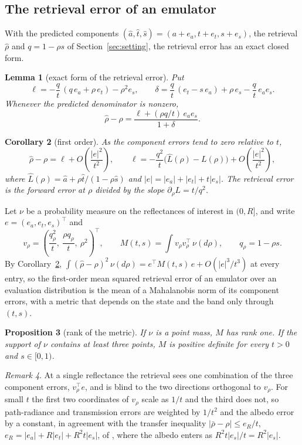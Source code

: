 \documentclass[11pt]{article}
\newtheorem{lemma}{Lemma}[section]
\newtheorem{proposition}[lemma]{Proposition}
\newtheorem{corollary}[lemma]{Corollary}
\theoremstyle{remark}
\newtheorem{remark}[lemma]{Remark}
\newcommand{\1}{\mathbf{1}}
\begin{document}
\subsection{The retrieval error of an emulator}\label{sec:exact}

With the predicted components $(\hat a,\hat t,\hat s)=(a+e_a,t+e_t,s+e_s)$, the retrieval $\hat\rho$ and
$q=1-\rho s$ of Section~\ref{sec:setting}, the retrieval error has an exact closed form.

\begin{lemma}[exact form of the retrieval error]\label{lem:exact}
Put
\[
\ell=-\frac{q}{t}\,(q\,e_a+\rho\,e_t)-\rho^2 e_s,\qquad
\delta=\frac{q}{t}\,(e_t-s\,e_a)+\rho\,e_s-\frac{q}{t}\,e_a e_s .
\]
Whenever the predicted denominator is nonzero,
\[
\hat\rho-\rho=\frac{\ell+(\rho q/t)\,e_a e_s}{1+\delta}.
\]
\end{lemma}

\begin{corollary}[first order]\label{cor:first}
As the component errors tend to zero relative to $t$,
\[
\hat\rho-\rho=\ell+O\!\left(\frac{|e|^2}{t^2}\right),\qquad
\ell=-\frac{q^2}{t}\bigl(\hat L(\rho)-L(\rho)\bigr)+O\!\left(\frac{|e|^2}{t^2}\right),
\]
where $\hat L(\rho)=\hat a+\rho\hat t/(1-\rho\hat s)$ and $|e|=|e_a|+|e_t|+t|e_s|$. The retrieval error is the forward
error at $\rho$ divided by the slope $\partial_\rho L=t/q^2$.
\end{corollary}

Let $\nu$ be a probability measure on the reflectances of interest in $(0,R]$, and write $e=(e_a,e_t,e_s)^\top$ and
\[
v_\rho=\left(\frac{q_\rho^2}{t},\ \frac{\rho q_\rho}{t},\ \rho^2\right)^{\!\top},\qquad
M(t,s)=\int v_\rho v_\rho^\top\,\nu(d\rho),\qquad q_\rho=1-\rho s .
\]
By Corollary~\ref{cor:first}, $\int(\hat\rho-\rho)^2\,\nu(d\rho)=e^\top M(t,s)\,e+O(|e|^3/t^3)$ at every entry, so the
first-order mean squared retrieval error of an emulator over an evaluation distribution is the mean of a Mahalanobis
norm of its component errors, with a metric that depends on the state and the band only through $(t,s)$.

\begin{proposition}[rank of the metric]\label{prop:rank}
If $\nu$ is a point mass, $M$ has rank one. If the support of $\nu$ contains at least three points, $M$ is positive
definite for every $t>0$ and $s\in[0,1)$.
\end{proposition}

\begin{remark}
At a single reflectance the retrieval sees one combination of the three component errors, $v_\rho^\top e$, and is
blind to the two directions orthogonal to $v_\rho$. For small $t$ the first two coordinates of $v_\rho$ scale as $1/t$
and the third does not, so path-radiance and transmission errors are weighted by $1/t^2$ and the albedo error by a
constant, in agreement with the transfer inequality $|\bar\rho-\rho|\le e_R/t$, $e_R=|e_a|+R|e_t|+R^2t|e_s|$, of
\cite{shmalo2}, where the albedo enters as $R^2t|e_s|/t=R^2|e_s|$.
\end{remark}
\end{document}
